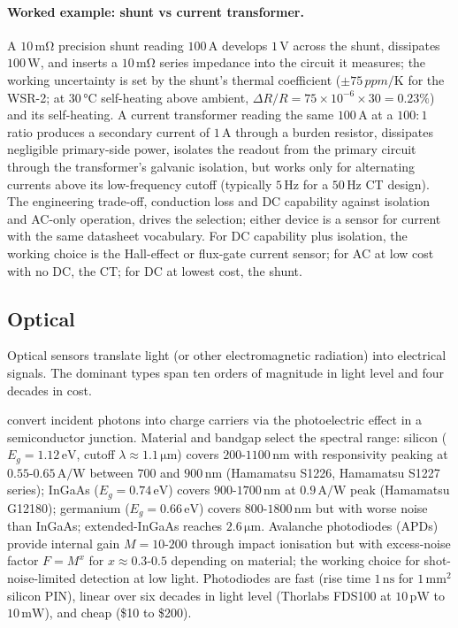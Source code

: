 \paragraph{Worked example: shunt vs current transformer.} A
$10\,\si{\milli\ohm}$ precision shunt reading $100\,\si{\ampere}$
develops $1\,\si{\volt}$ across the shunt, dissipates $100\,\si{
\watt}$, and inserts a $10\,\si{\milli\ohm}$ series impedance into
the circuit it measures; the working uncertainty is set by the
shunt's thermal coefficient ($\pm 75\,\si{ppm/\kelvin}$ for the
WSR-2; at $30\,\si{\degreeCelsius}$ self-heating above ambient,
$\Delta R/R = 75 \times 10^{-6} \times 30 = 0.23\%$) and its
self-heating. A current transformer reading the same $100\,\si{
\ampere}$ at a $100:1$ ratio produces a secondary current of
$1\,\si{\ampere}$ through a burden resistor, dissipates negligible
primary-side power, isolates the readout from the primary
circuit through the transformer's galvanic isolation, but works
only for alternating currents above its low-frequency cutoff
(typically $5\,\si{\hertz}$ for a $50\,\si{\hertz}$ CT design).
The engineering trade-off, conduction loss and DC capability
against isolation and AC-only operation, drives the selection;
either device is a sensor for current with the same datasheet
vocabulary. For DC capability plus isolation, the working choice
is the Hall-effect or flux-gate current sensor; for AC at low cost
with no DC, the CT; for DC at lowest cost, the shunt.

\subsection{Optical}

Optical sensors translate light (or other electromagnetic
radiation) into electrical signals. The dominant types span ten
orders of magnitude in light level and four decades in cost.

 convert incident photons into charge
carriers via the photoelectric effect in a semiconductor junction.
Material and bandgap select the spectral range: silicon
($E_{g} = 1.12\,\si{\electronvolt}$, cutoff $\lambda \approx
1.1\,\si{\micro\meter}$) covers $200$-$1100\,\si{\nano\meter}$ with
responsivity peaking at $0.55$-$0.65\,\si{\ampere\per\watt}$
between $700$ and $900\,\si{\nano\meter}$ (Hamamatsu S1226,
Hamamatsu S1227 series); InGaAs ($E_{g} = 0.74\,\si{\electronvolt}$)
covers $900$-$1700\,\si{\nano\meter}$ at $0.9\,\si{\ampere\per
\watt}$ peak (Hamamatsu G12180); germanium ($E_{g} = 0.66\,\si{
\electronvolt}$) covers $800$-$1800\,\si{\nano\meter}$ but with
worse noise than InGaAs; extended-InGaAs reaches $2.6\,\si{
\micro\meter}$. Avalanche photodiodes (APDs) provide internal
gain $M = 10$-$200$ through impact ionisation but with
excess-noise factor $F = M^{x}$ for $x \approx 0.3$-$0.5$
depending on material; the working choice for shot-noise-limited
detection at low light. Photodiodes are fast (rise time
$1\,\si{\nano\second}$ for $1\,\si{\milli\meter}^{2}$ silicon
PIN), linear over six decades in light level (Thorlabs FDS100 at
$10\,\si{\pico\watt}$ to $10\,\si{\milli\watt}$), and cheap (\$10
to \$200).

